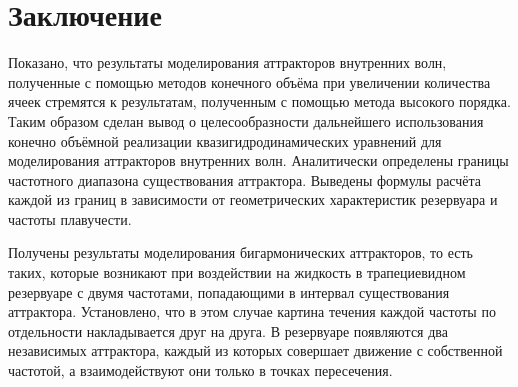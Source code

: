 \chapter{Заключение}
\label{cha:Conclusion}





Показано, что результаты моделирования аттракторов внутренних волн, полученные с помощью методов конечного объёма при увеличении количества ячеек стремятся к результатам, полученным с помощью метода высокого порядка. Таким образом сделан вывод о целесообразности дальнейшего использования конечно объёмной реализации квазигидродинамических уравнений для моделирования аттракторов внутренних волн. 
Аналитически определены  границы частотного диапазона существования аттрактора. Выведены формулы расчёта каждой из границ в зависимости от геометрических характеристик резервуара и частоты плавучести.


Получены результаты моделирования бигармонических аттракторов, то есть таких, которые возникают при воздействии на жидкость в трапециевидном резервуаре с двумя частотами, попадающими в интервал существования аттрактора. Установлено, что в этом случае картина течения каждой частоты по отдельности накладывается друг на друга. В резервуаре появляются два независимых аттрактора, каждый из которых совершает движение с собственной частотой, а взаимодействуют они только в точках пересечения. 


